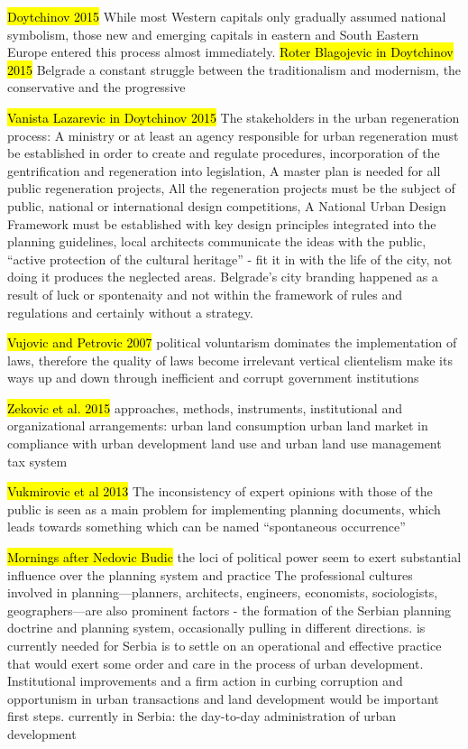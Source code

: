 \documentclass[11pt]{report}
\begin{document}
\hl{Doytchinov 2015}
While most Western capitals only gradually assumed national symbolism, those new and emerging capitals in eastern and South Eastern Europe entered this process almost immediately.
\hl{Roter Blagojevic in Doytchinov 2015}
Belgrade a constant struggle between the traditionalism and modernism, the conservative and the progressive

\hl{Vanista Lazarevic in Doytchinov 2015}
The stakeholders in the urban regeneration process:
A ministry or at least an agency responsible for urban regeneration must be established in order to create and regulate procedures, 
incorporation of the gentrification and regeneration into legislation,
A master plan is needed for all public regeneration projects,
All the regeneration projects must be the subject of public, national or international design competitions,
A National Urban Design Framework must be established with key design principles integrated into the planning guidelines,
local architects communicate the ideas with the public,
“active protection of the cultural heritage” - fit it in with the life of the city, not doing it produces the neglected areas.
Belgrade’s city branding happened as a result of luck or spontenaity and not within the framework of rules and regulations  and  certainly  without  a  strategy.

\hl{Vujovic and Petrovic 2007}
political voluntarism dominates the implementation of laws, therefore the quality of laws become irrelevant
vertical clientelism make its ways up and down through inefficient and corrupt government institutions 

\hl{Zekovic et al. 2015}
approaches, methods, instruments, institutional and organizational arrangements:
    urban land consumption
    urban land market in compliance with urban development
    land use and urban land use management
    tax system 

\hl{Vukmirovic et al 2013}
The inconsistency of expert opinions with those of the public is seen 
as  a  main  problem  for  implementing  planning  documents,  which  leads  towards  something  which  can  be named “spontaneous occurrence”

\hl{Mornings after Nedovic Budic}
the loci of political power seem to exert substantial inﬂuence over the planning system and practice
The professional cultures involved in planning—planners, architects, engineers, economists, sociologists, geographers—are also prominent factors - the formation of the Serbian planning doctrine and planning system, occasionally pulling in different directions.
is currently needed for Serbia is to settle on an operational and effective practice that would exert some order and care in the process of urban development. Institutional improvements and a ﬁrm action in curbing corruption and opportunism in urban transactions and land development would be important ﬁrst steps.
currently in Serbia:  the day-to-day administration of urban
development
\end{document}
